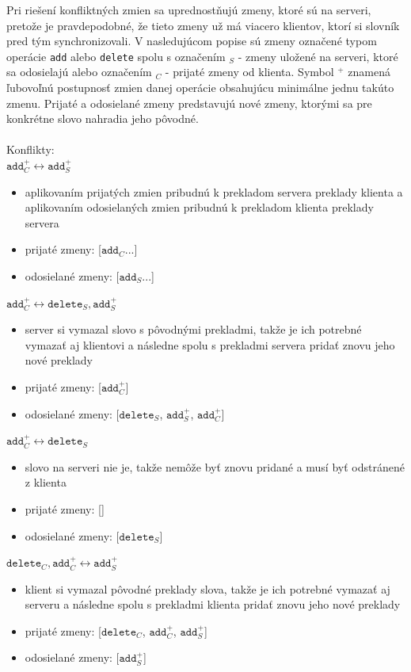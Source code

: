 \documentclass[
  digital, %
  table,   %
  lof,     %
  lot,     %
]{fithesis3}
\begin{document}
Pri riešení konfliktných zmien sa uprednostňujú zmeny, ktoré sú na serveri, pretože je pravdepodobné, že tieto zmeny už má viacero klientov, ktorí si slovník pred tým synchronizovali. V nasledujúcom popise sú zmeny označené typom operácie \texttt{add} alebo \texttt{delete} spolu s označením $_S$ - zmeny uložené na serveri, ktoré sa odosielajú alebo označením $_C$ - prijaté zmeny od klienta. Symbol $^+$ znamená ľubovoľnú postupnosť zmien danej operácie obsahujúcu minimálne jednu takúto zmenu. Prijaté a odosielané zmeny predstavujú nové zmeny, ktorými sa pre konkrétne slovo nahradia jeho pôvodné.
\\
\\
Konflikty:
\\
\noindent
$\texttt{add}_{C}^+ \longleftrightarrow \texttt{add}_{S}^+$
\begin{itemize}
\item aplikovaním prijatých zmien pribudnú k prekladom servera preklady klienta a aplikovaním odosielaných zmien pribudnú k prekladom klienta preklady servera 
\item prijaté zmeny: [$\texttt{add}_{C}...$]
\item odosielané zmeny: [$\texttt{add}_{S}...$] 
\end{itemize}

\noindent
$\texttt{add}_{C}^+ \longleftrightarrow \texttt{delete}_{S}, \texttt{add}_{S}^+$
\begin{itemize}
\item server si vymazal slovo s pôvodnými prekladmi, takže je ich potrebné vymazať aj klientovi a následne spolu s prekladmi servera pridať znovu jeho nové preklady
\item prijaté zmeny: [$\texttt{add}_{C}^+$]
\item odosielané zmeny: [$\texttt{delete}_{S}$, $\texttt{add}_{S}^+$, $\texttt{add}_{C}^+$] 
\end{itemize}

\noindent
$\texttt{add}_{C}^+ \longleftrightarrow \texttt{delete}_{S}$
\begin{itemize}
\item slovo na serveri nie je, takže nemôže byť znovu pridané a musí byť odstránené z klienta
\item prijaté zmeny: []
\item odosielané zmeny: [$\texttt{delete}_{S}$]
\end{itemize}
\noindent
$\texttt{delete}_{C}, \texttt{add}_{C}^+ \longleftrightarrow \texttt{add}_{S}^+$
\begin{itemize}
\item klient si vymazal pôvodné preklady slova, takže je ich potrebné vymazať aj serveru a následne spolu s prekladmi klienta pridať znovu jeho nové preklady
\item prijaté zmeny: [$\texttt{delete}_{C}$, $\texttt{add}_{C}^+$, $\texttt{add}_{S}^+$]
\item odosielané zmeny: [$\texttt{add}_{S}^+$]
\end{itemize}
\end{document}

